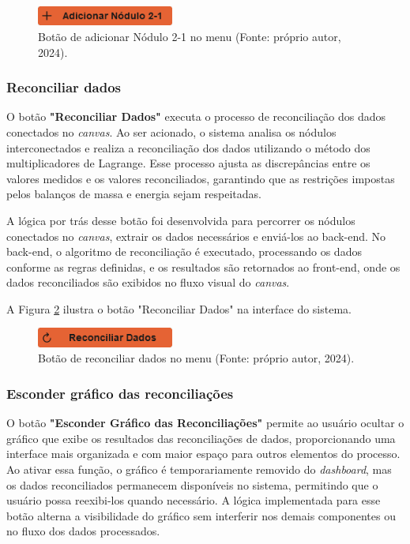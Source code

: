 \begin{figure}[htbp]
    \centering
    \includegraphics[width=0.4\textwidth]{figuras/add-node21-button.png}
    \caption{Botão de adicionar Nódulo 2-1 no menu (Fonte: próprio autor, 2024).}
    \label{Fig:AddNodeTwoOneButton}
\end{figure}

\subsubsection{Reconciliar dados}

O botão \textbf{"Reconciliar Dados"} executa o processo de reconciliação dos dados conectados no \textit{canvas}. Ao ser acionado, o sistema analisa os nódulos interconectados e realiza a reconciliação dos dados utilizando o método dos multiplicadores de Lagrange. Esse processo ajusta as discrepâncias entre os valores medidos e os valores reconciliados, garantindo que as restrições impostas pelos balanços de massa e energia sejam respeitadas.

A lógica por trás desse botão foi desenvolvida para percorrer os nódulos conectados no \textit{canvas}, extrair os dados necessários e enviá-los ao back-end. No back-end, o algoritmo de reconciliação é executado, processando os dados conforme as regras definidas, e os resultados são retornados ao front-end, onde os dados reconciliados são exibidos no fluxo visual do \textit{canvas}.

A Figura \ref{Fig:ReconcileButton} ilustra o botão "Reconciliar Dados" na interface do sistema.

\begin{figure}[htbp]
    \centering
    \includegraphics[width=0.4\textwidth]{figuras/reconcile-data-button.png}
    \caption{Botão de reconciliar dados no menu (Fonte: próprio autor, 2024).}
    \label{Fig:ReconcileButton}
\end{figure}

\subsubsection{Esconder gráfico das reconciliações}

O botão \textbf{"Esconder Gráfico das Reconciliações"} permite ao usuário ocultar o gráfico que exibe os resultados das reconciliações de dados, proporcionando uma interface mais organizada e com maior espaço para outros elementos do processo. Ao ativar essa função, o gráfico é temporariamente removido do \textit{dashboard}, mas os dados reconciliados permanecem disponíveis no sistema, permitindo que o usuário possa reexibi-los quando necessário. A lógica implementada para esse botão alterna a visibilidade do gráfico sem interferir nos demais componentes ou no fluxo dos dados processados.

